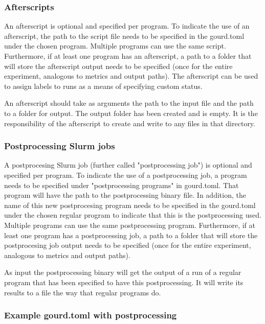 \subsubsection{Afterscripts}
An afterscript is optional and specified per program. To indicate the use of an afterscript, the path to the script 
file needs to be specified in the gourd.toml under the chosen program. Multiple programs can use the same script.
Furthermore, if at least one program has an afterscript, a path to a folder that will store the afterscript output 
needs to be specified (once for the entire experiment, analogous to metrics and output paths). The afterscript can 
be used to assign labels to runs as a means of specifying custom status.

An afterscript should take as arguments the path to the input file and the path to a folder for output. The output 
folder has been created and is empty. It is the responsibility of the afterscript to create and write to any files 
in that directory.

\subsubsection{Postprocessing Slurm jobs}
A postprocesing Slurm job (further called "postprocessing job") is optional and specified per program. To indicate 
the use of a postprocessing job, a program needs to be specified under "postprocessing programs" in gourd.toml. 
That program will have the path to the postprocessing binary file. In addition, the name of this new postprocesing 
program needs to be specified in the gourd.toml under the chosen regular program to indicate that this is the 
postprocessing used. Multiple programs can use the same postprocessing program. Furthermore, if at least one program 
has a postprocessing job, a path to a folder that will store the postprocesing job output needs to be specified 
(once for the entire experiment, analogous to metrics and output paths). 

As input the postprocessing binary will get the output of a run of a regular program that has been specified to have
this postprocessing. It will write its results to a file the way that regular programs do.

\subsubsection{Example gourd.toml with postprocessing}

